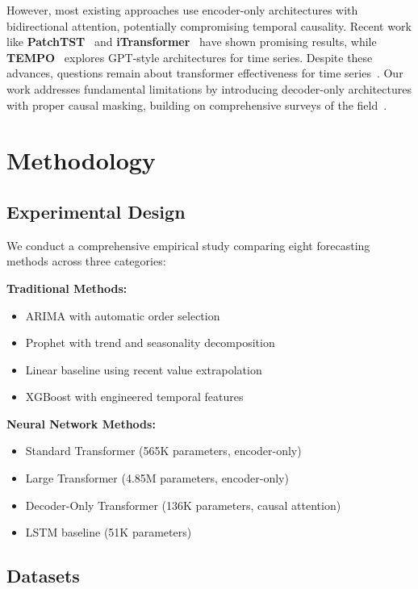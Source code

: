 \documentclass[11pt]{article}
\begin{document}
However, most existing approaches use encoder-only architectures with bidirectional attention, potentially compromising temporal causality. Recent work like \textbf{PatchTST}~\cite{nie2023time} and \textbf{iTransformer}~\cite{liu2024itransformer} have shown promising results, while \textbf{TEMPO}~\cite{chen2024tempo} explores GPT-style architectures for time series. Despite these advances, questions remain about transformer effectiveness for time series~\cite{zeng2023transformers}. Our work addresses fundamental limitations by introducing decoder-only architectures with proper causal masking, building on comprehensive surveys of the field~\cite{wen2022transformers}.

\section{Methodology}

\subsection{Experimental Design}

We conduct a comprehensive empirical study comparing eight forecasting methods across three categories:

\textbf{Traditional Methods:}
\begin{itemize}
\item ARIMA with automatic order selection
\item Prophet with trend and seasonality decomposition  
\item Linear baseline using recent value extrapolation
\item XGBoost with engineered temporal features
\end{itemize}

\textbf{Neural Network Methods:}
\begin{itemize}
\item Standard Transformer (565K parameters, encoder-only)
\item Large Transformer (4.85M parameters, encoder-only)
\item Decoder-Only Transformer (136K parameters, causal attention)
\item LSTM baseline (51K parameters)
\end{itemize}

\subsection{Datasets}
\end{document}

